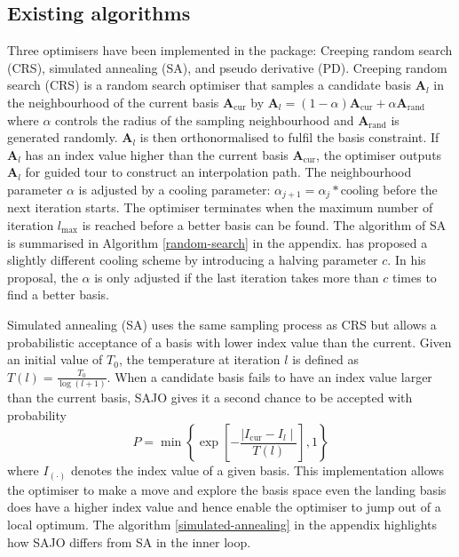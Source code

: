 \hypertarget{existing-algorithms}{%
\subsection{Existing algorithms}\label{existing-algorithms}}

Three optimisers have been implemented in the 
\citep{tourr} package: Creeping random search (CRS), simulated annealing
(SA), and pseudo derivative (PD). Creeping random search (CRS) is a
random search optimiser that samples a candidate basis
\(\mathbf{A}_{l}\) in the neighbourhood of the current basis
\(\mathbf{A}_{\text{cur}}\) by
\(\mathbf{A}_{l} = (1- \alpha)\mathbf{A}_{\text{cur}} + \alpha \mathbf{A}_{\text{rand}}\)
where \(\alpha\) controls the radius of the sampling neighbourhood and
\(\mathbf{A}_{\text{rand}}\) is generated randomly. \(\mathbf{A}_{l}\)
is then orthonormalised to fulfil the basis constraint. If
\(\mathbf{A}_{l}\) has an index value higher than the current basis
\(\mathbf{A}_{\text{cur}}\), the optimiser outputs \(\mathbf{A}_{l}\)
for guided tour to construct an interpolation path. The neighbourhood
parameter \(\alpha\) is adjusted by a cooling parameter:
\(\alpha_{j+1} = \alpha_j * \text{cooling}\) before the next iteration
starts. The optimiser terminates when the maximum number of iteration
\(l_{\max}\) is reached before a better basis can be found. The
algorithm of SA is summarised in Algorithm \ref{random-search} in the
appendix. \citet{posse1995projection} has proposed a slightly different
cooling scheme by introducing a halving parameter \(c\). In his
proposal, the \(\alpha\) is only adjusted if the last iteration takes
more than \(c\) times to find a better basis.

Simulated annealing (SA)
\citep{kirkpatrick1983optimization, bertsimas1993simulated} uses the
same sampling process as CRS but allows a probabilistic acceptance of a
basis with lower index value than the current. Given an initial value of
\(T_0\), the temperature at iteration \(l\) is defined as
\(T(l) = \frac{T_0}{\log(l + 1)}\). When a candidate basis fails to have
an index value larger than the current basis, SAJO gives it a second
chance to be accepted with probability
\[P= \min\left\{\exp\left[-\frac{\mid I_{\text{cur}} - I_{l} \mid}{T(l)}\right],1\right\}\]
where \(I_{(\cdot)}\) denotes the index value of a given basis. This
implementation allows the optimiser to make a move and explore the basis
space even the landing basis does have a higher index value and hence
enable the optimiser to jump out of a local optimum. The algorithm
\ref{simulated-annealing} in the appendix highlights how SAJO differs
from SA in the inner loop.


